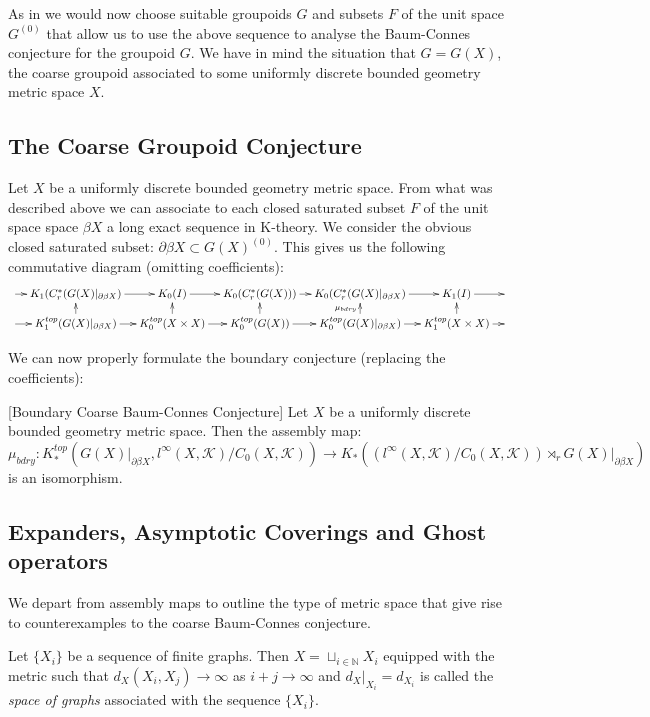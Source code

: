 \begin{conjecture}
{As in \cite{MR1911663} we would now choose suitable groupoids $G$ and subsets $F$ of the unit space $G^{(0)}$ that allow us to use the above sequence to analyse the Baum-Connes conjecture for the groupoid $G$. We have in mind the situation that $G=G(X)$, the coarse groupoid associated to some uniformly discrete bounded geometry metric space $X$.

\subsection{The Coarse Groupoid Conjecture}
Let $X$ be a uniformly discrete bounded geometry metric space. From what was described above we can associate to each closed saturated subset $F$ of the unit space space $\beta X$ a long exact sequence in K-theory. We consider the obvious closed saturated subset: $\partial \beta X \subset G(X)^{(0)}$. This gives us the following commutative diagram (omitting coefficients):
\begin{equation*}
\xymatrix@=1em{
\ar[r] & K_{1}(C^{*}_{r}(G(X)|_{\partial\beta X}) \ar[r] & K_{0}(I) \ar[r]& K_{0}(C^{*}_{r}(G(X))) \ar[r]& K_{0}(C^{*}_{r}(G(X)|_{\partial\beta X})\ar[r] & K_{1}(I)\ar[r] &  \\
\ar[r] & K_{1}^{top}(G(X)|_{\partial\beta X}) \ar[r] \ar[u]& K_{0}^{top}(X \times X) \ar[r]\ar[u]& K_{0}^{top}(G(X)) \ar[r]\ar[u]& K_{0}^{top}(G(X)|_{\partial\beta X}) \ar[r]\ar[u]^{\mu_{bdry}}& K_{1}^{top}(X \times X)\ar[u]\ar[r] &
}
\end{equation*}

We can now properly formulate the boundary conjecture (replacing the coefficients):

\begin{conj}\label{MC:S1} [Boundary Coarse Baum-Connes Conjecture]
Let $X$ be a uniformly discrete bounded geometry metric space. Then the assembly map:
\begin{equation*}
\mu_{bdry}:K_{*}^{top}(G(X)|_{\partial\beta X}, l^{\infty}(X,\mathcal{K})/C_{0}(X,\mathcal{K})) \rightarrow K_{*}((l^{\infty}(X,\mathcal{K})/C_{0}(X,\mathcal{K}))\rtimes_{r}G(X)|_{\partial\beta X})
\end{equation*}
is an isomorphism.
\end{conj}
\subsection{Expanders, Asymptotic Coverings and Ghost operators}\label{Sect:GO}
We depart from assembly maps to outline the type of metric space that give rise to counterexamples to the coarse Baum-Connes conjecture.
\begin{definition}
Let $\lbrace X_{i} \rbrace$ be a sequence of finite graphs. Then $X=\sqcup_{i\in\mathbb{N}}X_{i}$ equipped with the metric such that $d_{X}(X_{i},X_{j})\rightarrow \infty$ as $i+j\rightarrow \infty$ and $d_{X}|_{X_{i}}=d_{X_{i}}$ is called the \textit{space of graphs} associated with the sequence $\lbrace X_{i} \rbrace$. 
\end{definition}

}
\end{conjecture}
